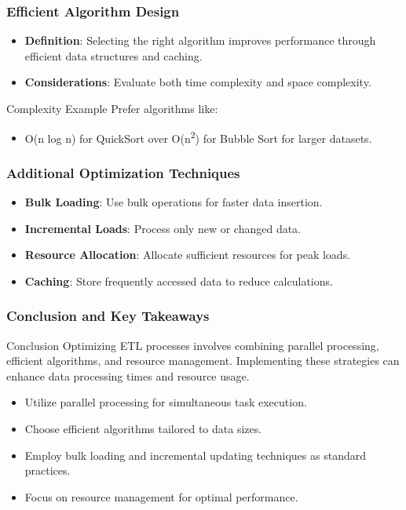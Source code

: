 \documentclass[aspectratio=169]{beamer}
\begin{document}
\begin{frame}[fragile]
    \frametitle{Efficient Algorithm Design}
    \begin{itemize}
        \item \textbf{Definition}: Selecting the right algorithm improves performance through efficient data structures and caching.
        \item \textbf{Considerations}: Evaluate both time complexity and space complexity.
    \end{itemize}
    \begin{block}{Complexity Example}
        Prefer algorithms like:
        \begin{itemize}
            \item O(n log n) for QuickSort over O(n\textsuperscript{2}) for Bubble Sort for larger datasets.
        \end{itemize}
    \end{block}
\end{frame}

\begin{frame}[fragile]
    \frametitle{Additional Optimization Techniques}
    \begin{itemize}
        \item \textbf{Bulk Loading}: Use bulk operations for faster data insertion.
        \item \textbf{Incremental Loads}: Process only new or changed data.
        \item \textbf{Resource Allocation}: Allocate sufficient resources for peak loads.
        \item \textbf{Caching}: Store frequently accessed data to reduce calculations.
    \end{itemize}
\end{frame}

\begin{frame}[fragile]
    \frametitle{Conclusion and Key Takeaways}
    \begin{block}{Conclusion}
        Optimizing ETL processes involves combining parallel processing, efficient algorithms, and resource management. Implementing these strategies can enhance data processing times and resource usage.
    \end{block}
    \begin{itemize}
        \item Utilize parallel processing for simultaneous task execution.
        \item Choose efficient algorithms tailored to data sizes.
        \item Employ bulk loading and incremental updating techniques as standard practices.
        \item Focus on resource management for optimal performance.
    \end{itemize}
\end{frame}
\end{document}
